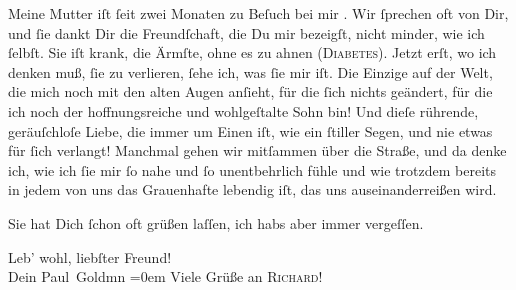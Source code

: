 \pstart
           Meine Mutter iſt{ }ſeit zwei
               Monaten zu Beſuch bei mir . Wir{ }ſprechen oft von
               Dir, und{ }ſie dankt Dir die Freundſchaft, die Du mir bezeigſt, nicht minder, wie ich{ }ſelbſt. Sie iſt krank, die Ärmſte, ohne es zu ahnen (\textsc{Diabetes}). Jetzt erſt,
               wo ich denken muß,{ }ſie zu verlieren,{ }ſehe ich, was{ }ſie mir iſt. Die Einzige auf der Welt, die mich noch  mit den alten {\pb}Augen anſieht, für die{ }ſich nichts geändert, für die
               ich noch der hoffnungsreiche und wohlgeſtalte Sohn bin! Und dieſe rührende,
               geräuſchloſe Liebe, die immer um Einen iſt, wie ein{ }ſtiller Segen, und nie etwas für{ }ſich verlangt! Manchmal gehen wir mitſammen über die Straße, und da denke ich, wie
                   ich{ }ſie mir{ }ſo nahe und{ }ſo unentbehrlich
               fühle und wie trotzdem bereits in jedem von uns das Grauenhafte lebendig iſt, das uns
               auseinanderreißen wird.\pend
           
\pstart
           Sie hat Dich{ }ſchon oft grüßen laſſen, ich habs aber immer vergeſſen.\pend
           
\pstart
           Leb’ wohl, liebſter Freund! {\\[\baselineskip]}Dein \spacefill\mbox{Paul Goldmn}\pend
           \leftskip=0em{}
\pstart
           \noindent{}Viele Grüße an \textsc{Richard}!\pend
           \endnumbering{}  \newcommand{\dateiname}{L02741}\newcommand{\titel}{Paul Goldmann an Arthur Schnitzler, 25. 7. [1895]}\newcommand{\editorInnen}{Martin Anton Müller und Laura Untner}
